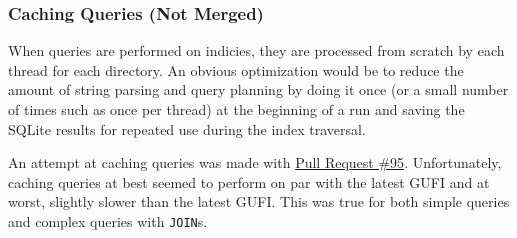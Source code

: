 \subsubsection{Caching Queries (Not Merged)}
When queries are performed on indicies, they are processed from
scratch by each thread for each directory. An obvious optimization
would be to reduce the amount of string parsing and query planning by
doing it once (or a small number of times such as once per thread) at
the beginning of a run and saving the SQLite results for repeated
use during the index traversal.

An attempt at caching queries was made with
\href{https://github.com/mar-file-system/GUFI/pull/95}{Pull Request
  \#95}. Unfortunately, caching queries at best seemed to perform on
par with the latest GUFI and at worst, slightly slower than the latest
GUFI. This was true for both simple queries and complex queries with
\texttt{JOIN}s.
